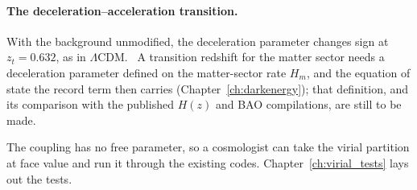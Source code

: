 \paragraph{The deceleration--acceleration transition.} With the background unmodified, the deceleration parameter changes sign at $z_t=0.632$, as in
$\Lambda$CDM. \calc\ A transition redshift for the matter sector needs a deceleration parameter defined on the matter-sector rate $H_m$, and the equation of
state the record term then carries (Chapter~\ref{ch:darkenergy}); that definition, and its comparison with the published $H(z)$ and BAO compilations, are still
to be made. \openprob

The coupling has no free parameter, so a cosmologist can take the virial partition at face value and run it through the existing codes. Chapter~\ref{ch:virial_tests} lays out the tests.
